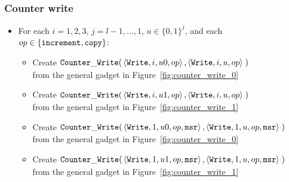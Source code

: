 \subsubsection{ Counter write }

\begin{itemize}

    \item For each $i = 1,2,3$,
                   $j = l-1,\ldots,1$,
                   $u \in \{0, 1\}^j$, and each
                   $op \in \{{\tt increment}, {\tt copy} \}$:
        \begin{itemize}
        \item Create
        $\begin{aligned}[t]
            {\tt Counter\_Write}(& \left\langle {\tt Write}, i, u0, op \right\rangle,
                       \left\langle {\tt Write}, i, u,  op \right\rangle \;)
        \end{aligned}$ \\ from the general gadget in Figure~\ref{fig:counter_write_0}

        \item Create
        $\begin{aligned}[t]
            {\tt Counter\_Write}(& \left\langle {\tt Write}, i,  u1, op \right\rangle,
                       \left\langle {\tt Write}, i,  u,  op \right\rangle \;)
        \end{aligned}$ \\ from the general gadget in Figure~\ref{fig:counter_write_1}


        \item Create
        $\begin{aligned}[t]
            {\tt Counter\_Write}(& \left\langle {\tt Write}, 1, u0, op, {\tt msr} \right\rangle,
                       \left\langle {\tt Write}, 1, u,  op, {\tt msr} \right\rangle \;)
        \end{aligned}$ \\ from the general gadget in Figure~\ref{fig:counter_write_0}

        \item Create
        $\begin{aligned}[t]
            {\tt Counter\_Write}(& \left\langle {\tt Write}, 1,  u1, op, {\tt msr} \right\rangle,
                       \left\langle {\tt Write}, 1,  u,  op, {\tt msr} \right\rangle \;)
        \end{aligned}$ \\ from the general gadget in Figure~\ref{fig:counter_write_1}


\end{itemize}
\end{itemize}

